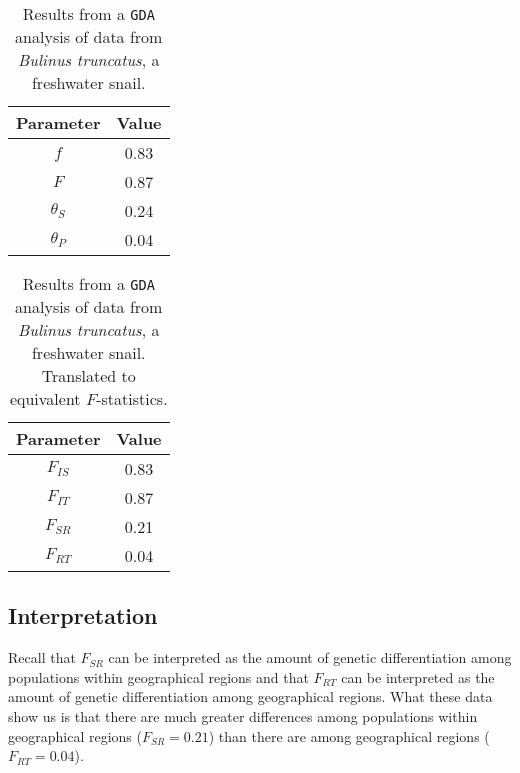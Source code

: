 \documentclass[12pt]{article}
\begin{document}
\begin{table}
\begin{center}
\begin{tabular}{cc}
\hline\hline
Parameter  & Value \\
\hline
$f$        & 0.83 \\
$F$        & 0.87 \\
$\theta_S$ & 0.24 \\
$\theta_P$ & 0.04 \\
\hline
\end{tabular}
\end{center}
\caption{Results from a {\tt GDA} analysis of data from {\it Bulinus
    truncatus}, a freshwater snail.}\label{table:bulinus-gda}
\end{table}

\begin{table}
\begin{center}
\begin{tabular}{cc}
\hline\hline
Parameter  & Value \\
\hline
$F_{IS}$   & 0.83 \\
$F_{IT}$   & 0.87 \\
$F_{SR}$   & 0.21 \\
$F_{RT}$   & 0.04 \\
\hline
\end{tabular}
\end{center}
\caption{Results from a {\tt GDA} analysis of data from {\it Bulinus
    truncatus}, a freshwater snail. Translated to equivalent
  $F$-statistics.}\label{table:bulinus-gda} 
\end{table}

\subsection*{Interpretation}

Recall that $F_{SR}$ can be interpreted as the amount of genetic
differentiation among populations within geographical regions and that
$F_{RT}$ can be interpreted as the amount of genetic differentiation
among geographical regions. What these data show us is that there are
much greater differences among populations within geographical regions
($F_{SR}=0.21$) than there are among geographical regions
($F_{RT}=0.04$).

\ccLicense
\end{document}
